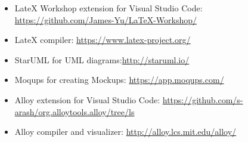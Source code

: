 \begin{itemize}
    \item LateX Workshop extension for Visual Studio Code: \newline\href{https://github.com/James-Yu/LaTeX-Workshop/}{https://github.com/James-Yu/LaTeX-Workshop/}
    \item LateX compiler: \newline\href{https://www.latex-project.org/}{https://www.latex-project.org/}
    \item StarUML for UML diagrams:\newline\href{http://staruml.io/}{http://staruml.io/}
    \item Moqups for creating Mockups: \newline\href{https://app.moqups.com/}{https://app.moqups.com/}
    \item Alloy extension for Visual Studio Code: \newline\href{https://github.com/s-arash/org.alloytools.alloy/tree/ls}{https://github.com/s-arash/org.alloytools.alloy/tree/ls}
    \item Alloy compiler and visualizer: \newline\href{http://alloy.lcs.mit.edu/alloy/}{http://alloy.lcs.mit.edu/alloy/}
\end{itemize}